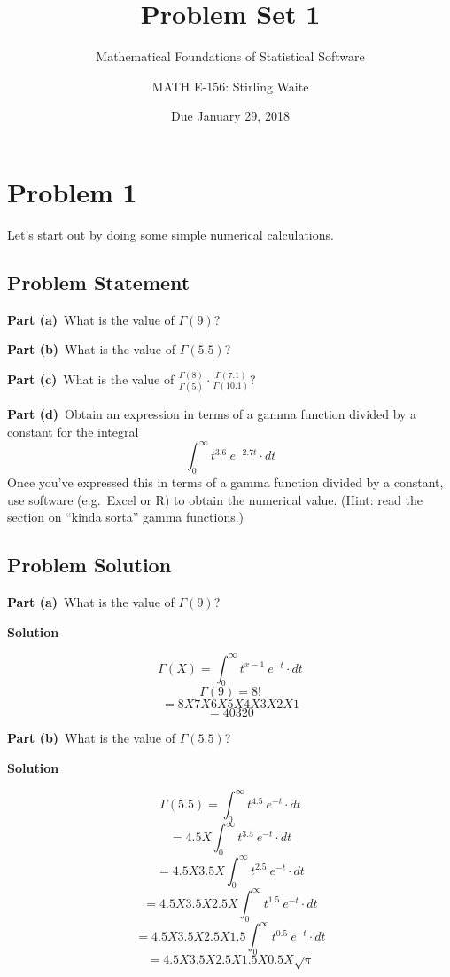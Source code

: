 \documentclass[12pt]{article}
\title{Problem Set 1}
\author{ Mathematical Foundations of Statistical Software}
\author{MATH E-156: Stirling Waite}
\date{Due January 29, 2018}
\theoremstyle{definition}
\begin{document}
	\maketitle





\section*{Problem 1}

Let's start out by doing some simple numerical calculations.

\subsection*{Problem Statement}

\noindent
{\bf Part (a)}\ What is the value of $\Gamma(9)$?

\bigskip
\noindent
{\bf Part (b)}\ What is the value of $\Gamma(5.5)$?

\bigskip
\noindent
{\bf Part (c)}\ What is the value of $\displaystyle \frac{ \Gamma(8) }{\Gamma(5)} \cdot \frac{\Gamma(7.1)}{\Gamma(10.1)}$?

\bigskip
\noindent
{\bf Part (d)}\ Obtain an expression in terms of a gamma function divided by a constant for the integral
$$
\int_0^\infty t^{3.6} \ e^{-2.7t} \cdot dt
$$
Once you've expressed this in terms of a gamma function divided by a constant, use software (e.g.\ Excel or R) to obtain the numerical value. (Hint: read the section on ``kinda sorta'' gamma functions.)

\newpage
\subsection*{Problem Solution}


\noindent
{\bf Part (a)}\ What is the value of $\Gamma(9)$?

\bigskip
\noindent
{\bf Solution}

$$
\Gamma(X) = \int_0^\infty t^{x-1} \ e^{-t} \cdot dt
$$
$$
\Gamma(9) = 8!
$$
$$
= 8X7X6X5X4X3X2X1
$$
$$ = 40320 $$

\vspace{1in}
\noindent
{\bf Part (b)}\ What is the value of $\Gamma(5.5)$?

\bigskip
\noindent
{\bf Solution}

$$ \Gamma(5.5) = \int_0^\infty t^{4.5} \ e^{-t} \cdot dt $$
$$ = 4.5 X \int_0^\infty t^{3.5} \ e^{-t} \cdot dt $$
$$ = 4.5 X 3.5 X \int_0^\infty t^{2.5} \ e^{-t} \cdot dt $$
$$ = 4.5 X 3.5 X 2.5 X \int_0^\infty t^{1.5} \ e^{-t} \cdot dt $$
$$ = 4.5 X 3.5 X 2.5 X 1.5 \int_0^\infty t^{0.5} \ e^{-t} \cdot dt $$
$$ = 4.5 X 3.5 X 2.5 X 1.5 X 0.5 X \sqrt{\pi} $$
\end{document}
